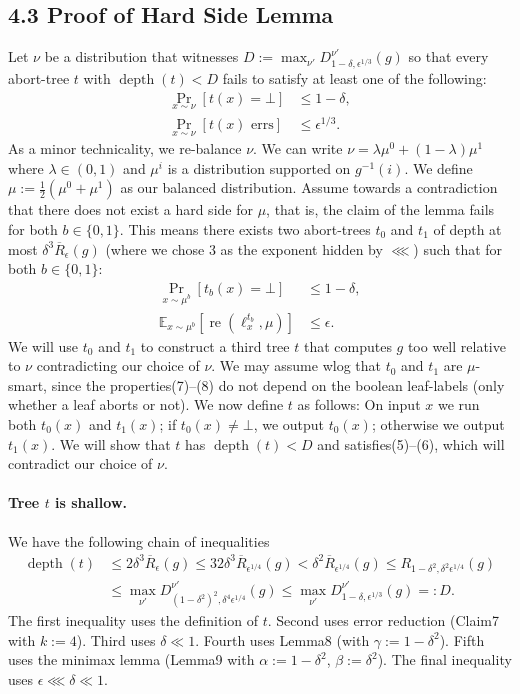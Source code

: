 \documentclass[10pt,a4paper]{article}
\begin{document}
\subsection*{4.3 Proof of Hard Side Lemma}
Let $\nu$ be a distribution that witnesses $D:=\max_{\nu'}D^{\nu'}_{1-\delta,\epsilon^{1/3}}(g)$ so that every abort-tree $t$ with $\operatorname{depth}(t)<D$ fails to satisfy at least one of the following:
\begin{align}\Pr_{x\sim\nu}[t(x)=\bot]&\le1-\delta,\tag{5}\\\Pr_{x\sim\nu}[t(x)\text{ errs}]&\le\epsilon^{1/3}.\tag{6}\end{align}
As a minor technicality, we re-balance $\nu$. We can write $\nu=\lambda\mu^0+(1-\lambda)\mu^1$ where $\lambda\in(0,1)$ and $\mu^i$ is a distribution supported on $g^{-1}(i)$. We define $\mu:=\frac12(\mu^0+\mu^1)$ as our balanced distribution.
Assume towards a contradiction that there does not exist a hard side for $\mu$, that is, the claim of the lemma fails for both $b\in\{0,1\}$. This means there exists two abort-trees $t_0$ and $t_1$ of depth at most $\delta^3\overline R_\epsilon(g)$ (where we chose 3 as the exponent hidden by $\lll$) such that for both $b\in\{0,1\}$:
\begin{align}\Pr_{x\sim\mu^b}[t_b(x)=\bot]&\le1-\delta,\tag{7}\\\mathbb E_{x\sim\mu^b}[\operatorname{re}(\ell_x^{t_b},\mu)]&\le\epsilon.\tag{8}\end{align}
We will use $t_0$ and $t_1$ to construct a third tree $t$ that computes $g$ too well relative to $\nu$ contradicting our choice of $\nu$. We may assume wlog that $t_0$ and $t_1$ are $\mu$-smart, since the properties(7)--(8) do not depend on the boolean leaf-labels (only whether a leaf aborts or not). We now define $t$ as follows: On input $x$ we run both $t_0(x)$ and $t_1(x)$; if $t_0(x)\ne\bot$, we output $t_0(x)$; otherwise we output $t_1(x)$. We will show that $t$ has $\operatorname{depth}(t)<D$ and satisfies(5)--(6), which will contradict our choice of $\nu$.
\paragraph{Tree $t$ is shallow.} We have the following chain of inequalities
\begin{align*}
\operatorname{depth}(t)&\le2\delta^3\overline R_\epsilon(g)\le32\delta^3\overline R_{\epsilon^{1/4}}(g)<\delta^2\overline R_{\epsilon^{1/4}}(g)\le R_{1-\delta^2,\delta^2\epsilon^{1/4}}(g)\\
&\le\max_{\nu'}D^{\nu'}_{(1-\delta^2)^2,\delta^4\epsilon^{1/4}}(g)\le\max_{\nu'}D^{\nu'}_{1-\delta,\epsilon^{1/3}}(g)=:D.
\end{align*}
The first inequality uses the definition of $t$. Second uses error reduction (Claim7 with $k:=4$). Third uses $\delta\ll1$. Fourth uses Lemma8 (with $\gamma:=1-\delta^2$). Fifth uses the minimax lemma (Lemma9 with $\alpha:=1-\delta^2$, $\beta:=\delta^2$). The final inequality uses $\epsilon\lll\delta\ll1$.
\end{document}
